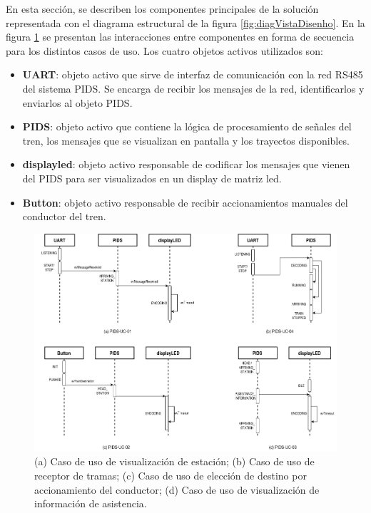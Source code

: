 En esta sección, se describen los componentes principales de la solución representada con el diagrama estructural de la figura \ref{fig:diagVistaDisenho}. En la figura \ref{fig:diagramaSecuenciaSistema} se presentan las interacciones entre componentes en forma de secuencia para los distintos casos de uso. Los cuatro objetos activos utilizados son:\\
\begin{itemize}
\item \textbf{UART}: objeto activo que sirve de interfaz de comunicación con la red RS485 del sistema PIDS. Se encarga de recibir los mensajes de la red, identificarlos y enviarlos al objeto PIDS.
\item \textbf{PIDS}: objeto activo que contiene la lógica de procesamiento de señales del tren, los mensajes que se visualizan en pantalla y los trayectos disponibles. 
\item \textbf{displayled}: objeto activo responsable de codificar los mensajes que vienen del PIDS para ser visualizados en un display de matriz led.
\item \textbf{Button}: objeto activo responsable de recibir accionamientos manuales del conductor del tren.
\end{itemize}

\begin{figure}[ht]
	\centering
	\includegraphics[width=1\textwidth]{../Figures/secuenciasSistema.png}
	\caption{(a) Caso de uso de visualización de estación; (b) Caso de uso de receptor de tramas; (c) Caso de uso de elección de destino por accionamiento del conductor; (d) Caso de uso de visualización de información de asistencia.}
	\label{fig:diagramaSecuenciaSistema}
\end{figure}


